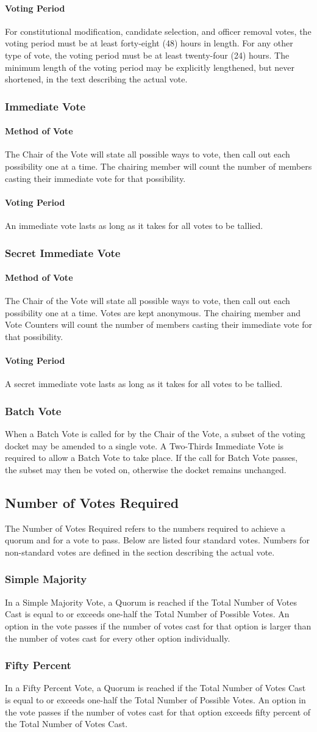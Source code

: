 \documentclass{article}
\newcommand{\asection}[1]{\subsection{#1} \label{#1}}
\newcommand{\asubsection}[1]{\subsubsection{#1} \label{#1}}
\newcommand{\asubsubsection}[1]{\paragraph{#1} \label{#1}}
\begin{document}
\asubsubsection{Voting Period}
For constitutional modification, candidate selection, and officer removal votes, the voting period must be at least forty-eight (48) hours in length.
For any other type of vote, the voting period must be at least twenty-four (24) hours.
The minimum length of the voting period may be explicitly lengthened, but never shortened, in the text describing the actual vote.

\asubsection{Immediate Vote}

\asubsubsection{Method of Vote}
The Chair of the Vote will state all possible ways to vote, then call out each possibility one at a time.
The chairing member will count the number of members casting their immediate vote for that possibility.

\asubsubsection{Voting Period}
An immediate vote lasts as long as it takes for all votes to be tallied.

\asubsection{Secret Immediate Vote}

\asubsubsection{Method of Vote}
The Chair of the Vote will state all possible ways to vote, then call out each possibility one at a time.
Votes are kept anonymous.
The chairing member and Vote Counters will count the number of members casting their immediate vote for that possibility.

\asubsubsection{Voting Period}
A secret immediate vote lasts as long as it takes for all votes to be tallied.

\asubsection{Batch Vote}
When a Batch Vote is called for by the Chair of the Vote, a subset of the voting docket may be amended to a single vote.
A Two-Thirds Immediate Vote is required to allow a Batch Vote to take place.
If the call for Batch Vote passes, the subset may then be voted on, otherwise the docket remains unchanged.

\asection{Number of Votes Required}
The Number of Votes Required refers to the numbers required to achieve a quorum and for a vote to pass.
Below are listed four standard votes.
Numbers for non-standard votes are defined in the section describing the actual vote.

\asubsection{Simple Majority}
In a Simple Majority Vote, a Quorum is reached if the Total Number of Votes Cast is equal to or exceeds one-half the Total Number of Possible Votes.
An option in the vote passes if the number of votes cast for that option is larger than the number of votes cast for every other option individually.

\asubsection{Fifty Percent}
In a Fifty Percent Vote, a Quorum is reached if the Total Number of Votes Cast is equal to or exceeds one-half the Total Number of Possible Votes.
An option in the vote passes if the number of votes cast for that option exceeds fifty percent of the Total Number of Votes Cast.
\end{document}
